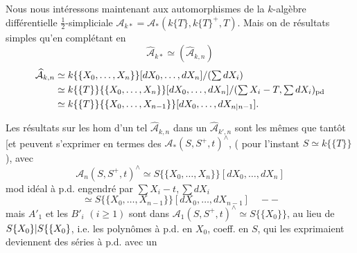 
Nous nous intéressons maintenant aux automorphismes de la $k$-algèbre différentielle
$\tfrac12$-simpliciale $\mathcal A_{k*}=\mathcal A_*(k\{T\},k\{T\}^+,T)$.
Mais on  de résultats simples qu'en complétant en
\[
 \widehat{\mathcal A}_{k*}\simeq(\widehat{\mathcal A}_{k,n})
\]
\[
 \begin{aligned}
 \widehat{\mathcal A}_{k,n}&\simeq k\{\{X_0,\ldots,X_n\}\}[dX_0,\ldots,dX_n]/(\textstyle\sum dX_i)\\
 &\simeq k\{\{T\}\}\{\{X_0,\ldots,X_n\}\}[dX_0,\ldots,dX_n]/
 (\textstyle\sum X_i-T,\sum dX_i)_{\mathrm{pd}}\\
 &\simeq k\{\{T\}\}\{\{X_0,\ldots,X_{n-1}\}\}[dX_0,\ldots,dX_{{n|n-1}}].
 \end{aligned}
\]

Les résultats sur les hom d'un tel $\widehat{\mathcal A}_{k,n}$ dans un
$\widehat{\mathcal A}_{k',n}$ sont les mêmes que tantôt [et peuvent s'exprimer en termes des
$\mathcal A_*(S,S^+,t)^\wedge$, ( pour l'instant $S\simeq k\{\{T\}\}$),
avec
\[
 \mathcal A_n(S,S^+,t)^\wedge\simeq S\{\{X_0,\ldots,X_n\}\}[dX_0,\ldots,dX_n]
\]
mod idéal à p.d. engendré par $\sum X_i-t,\sum dX_i$
\[
 \simeq S\{\{X_0,\ldots,X_{n-1}\}\}[dX_0,\ldots,dX_{n-1}]\quad--
\]
mais $A'_1$ et les $B'_i$ $(i\geq1)$ sont dans
$\mathcal A_1(S,S^+,t)^\wedge\simeq S\{\{X_0\}\}$, au lieu de
${S\{X_0\}|S\{\{X_0\}}$, i.e. les polynômes à p.d.
en $X_0$, coeff. en $S$, qui les exprimaient deviennent des séries à p.d. avec un
